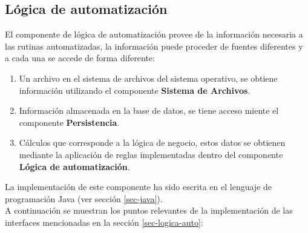 \subsection{Lógica de automatización}
El componente de lógica de automatización provee de la información necesaria a las rutinas automatizadas, la información puede proceder de fuentes diferentes y a cada una se accede de forma diferente:
\begin{enumerate}
 	\item Un archivo en el sistema de archivos del sistema operativo, se obtiene información utilizando el componente \textbf{Sistema de Archivos}.
 	\item Información almacenada en la base de datos, se tiene acceso miente el componente \textbf{Persistencia}.
 	\item Cálculos que corresponde a la lógica de negocio, estos datos se obtienen mediante la aplicación de reglas implementadas dentro del componente \textbf{Lógica de automatización}.
\end{enumerate}
La implementación de este componente ha sido escrita en el lenguaje de programación Java (ver sección \ref{sec-java}).\\
A continuación se muestran los puntos relevantes de la implementación de las interfaces mencionadas en la sección \ref{sec-logica-auto}:
